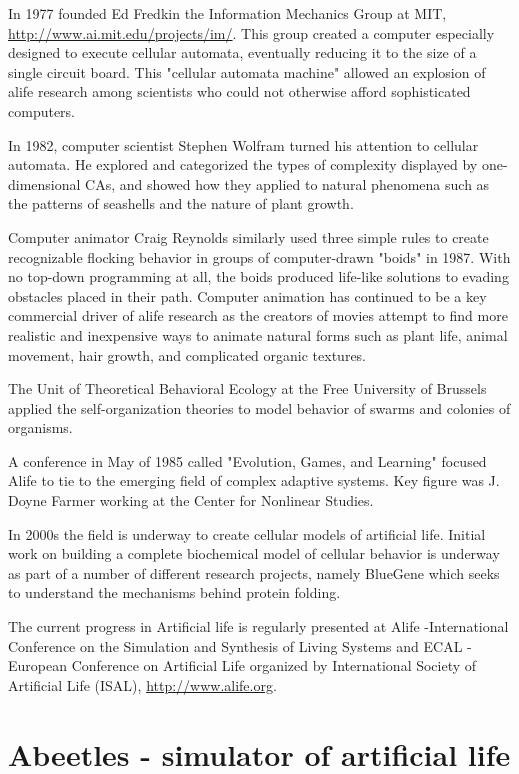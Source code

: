 \documentclass[a4paper,12pt]{report}
\begin{document}
In 1977 founded Ed Fredkin the Information Mechanics Group at MIT, \url{http://www.ai.mit.edu/projects/im/}. This group created a computer especially designed to execute cellular automata, eventually reducing it to the size of a single circuit board. This "cellular automata machine" allowed an explosion of alife research among scientists who could not otherwise afford sophisticated computers.

In 1982, computer scientist Stephen Wolfram turned his attention to cellular automata. He explored and categorized the types of complexity displayed by one-dimensional CAs, and showed how they applied to natural phenomena such as the patterns of seashells and the nature of plant growth. 

Computer animator Craig Reynolds similarly used three simple rules to create recognizable flocking behavior in groups of computer-drawn "boids" in 1987. With no top-down programming at all, the boids produced life-like solutions to evading obstacles placed in their path. Computer animation has continued to be a key commercial driver of alife research as the creators of movies attempt to find more realistic and inexpensive ways to animate natural forms such as plant life, animal movement, hair growth, and complicated organic textures.

The Unit of Theoretical Behavioral Ecology at the Free University of Brussels applied the self-organization theories to model behavior of swarms and colonies of organisms.

A conference in May of 1985 called "Evolution, Games, and Learning" focused Alife to tie to the emerging field of complex adaptive systems. Key figure was J. Doyne Farmer working at the Center for Nonlinear Studies.

In 2000s the field is underway to create cellular models of artificial life. Initial work on building a complete biochemical model of cellular behavior is underway as part of a number of different research projects, namely BlueGene which seeks to understand the mechanisms behind protein folding.

The current progress in Artificial life is regularly presented at Alife -International Conference on the Simulation and Synthesis of Living Systems and ECAL - European Conference on Artificial Life organized by International Society of Artificial Life (ISAL), \url{http://www.alife.org}. 

\section{Abeetles - simulator of artificial life}
\end{document}
